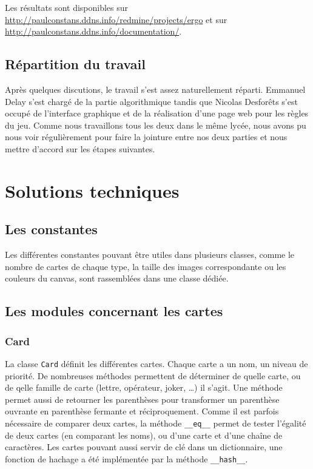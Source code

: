 \documentclass[12pt, a4paper]{article}
\begin{document}
Les résultats sont disponibles sur \url{http://paulconstans.ddns.info/redmine/projects/ergo} et sur \url{http://paulconstans.ddns.info/documentation/}.

\subsection{Répartition du travail}

Après quelques discutions, le travail s'est assez naturellement réparti. Emmanuel Delay s'est chargé de la partie algorithmique tandis que Nicolas Desforêts s'est occupé de l'interface graphique et de la réalisation d'une page web pour les règles du jeu. Comme nous travaillons tous les deux dans le même lycée, nous avons pu nous voir régulièrement pour faire la jointure entre nos deux parties et nous mettre d'accord sur les étapes suivantes.

\section{Solutions techniques}

\subsection{Les constantes}

Les différentes constantes pouvant être utiles dans plusieurs classes, comme le nombre de cartes de chaque type, la taille des images correspondante ou les couleurs du canvas, sont rassemblées dans une classe dédiée.

\subsection{Les modules concernant les cartes}


\subsubsection{Card}

La classe \texttt{Card} définit les différentes cartes. Chaque carte a un nom, un niveau de priorité. De nombreuses méthodes permettent de déterminer de quelle carte, ou de qelle famille de carte (lettre, opérateur, joker, \dots) il s'agit. Une méthode permet aussi de \og retourner \fg les parenthèses pour transformer un parenthèse ouvrante en parenthèse fermante et réciproquement. Comme il est parfois nécessaire de comparer deux cartes, la méthode \texttt{\_\_eq\_\_} permet de tester l'égalité de deux cartes (en comparant les noms), ou d'une carte et d'une chaîne de caractères. Les cartes pouvant aussi servir de clé dans un dictionnaire, une fonction de hachage a été implémentée par la méthode \texttt{\_\_hash\_\_}.
\end{document}
